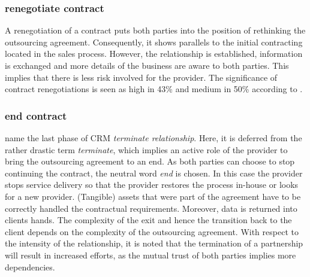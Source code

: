 	\subsubsection{renegotiate contract}
	A renegotiation of a contract puts both parties into the position of rethinking the outsourcing agreement. Consequently, it shows parallels to the initial contracting located in the sales process. However, the relationship is established, information is exchanged and more details of the business are aware to both parties. This implies that there is less risk involved for the provider. The significance of contract renegotiations is seen as high in 43\% and medium in 50\% according to \cite{itgov2005}. 
	
	
	\subsubsection{end contract}
	\cite{reinartz2004customer} name the last phase of \acrshort{CRM} \textit{terminate relationship}. Here, it is deferred from the rather drastic term \textit{terminate}, which implies an active role of the provider to bring the outsourcing agreement to an end. As both parties can choose to stop continuing the contract, the neutral word \textit{end} is chosen. In this case the provider stops service delivery so that the provider restores the process in-house or looks for a new provider. (Tangible) assets that were part of the agreement have to be correctly handled \wrt the contractual requirements. Moreover, data is returned into clients hands. The complexity of the exit and hence the transition back to the client depends on the complexity of the outsourcing agreement. With respect to the intensity of the relationship, it is noted that the termination of a partnership will result in increased efforts, as the mutual trust of both parties implies more dependencies. 
	 
